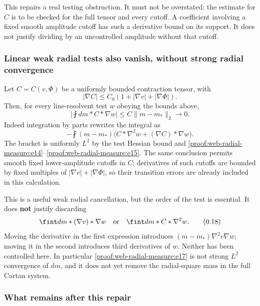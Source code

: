 This repairs a real testing obstruction. It must not be overstated: the estimate for \(C\) is to be checked for the full tensor and every cutoff. A coefficient involving a fixed smooth amplitude cutoff has such a derivative bound on its support. It does not justify dividing by an uncontrolled amplitude without that cutoff.

\hypertarget{proof:web-radial-measure:Linear-weak-radial-tests-also-vanish--without-strong-radial-convergence}{%
\subsubsection{Linear weak radial tests also vanish, without strong radial convergence}\label{proof:web-radial-measure:Linear-weak-radial-tests-also-vanish--without-strong-radial-convergence}}

Let \(C=C(v,\Phi)\) be a uniformly bounded contraction tensor, with \[
 |\nabla C|\le C_0(1+|\nabla v|+|\nabla\Phi|).
\] Then, for every line-resolvent test \(w\) obeying the bounds above, \[
 \boxed{\left|\fint dm*C*\nabla w\right|
 \le C\|m-m_*\|_2\to0.}
 \tag{\thesection.17}\label{proof:web-radial-measure:e17}
\] Indeed integration by parts rewrites the integral as \[
 -\fint(m-m_*)\bigl(C*\nabla^2w+(\nabla C)*\nabla w\bigr).
\] The bracket is uniformly \(L^2\) by the test Hessian bound and \eqref{proof:web-radial-measure:e14}–\eqref{proof:web-radial-measure:e15}. The same conclusion permits smooth fixed lower-amplitude cutoffs in \(C\): derivatives of such cutoffs are bounded by fixed multiples of \(|\nabla v|+|\nabla\Phi|\), so their transition errors are already included in this calculation.

This is a useful weak radial cancellation, but the order of the test is essential. It does \textbf{not} justify discarding \[
 \fint dm*(\nabla v)*\nabla w
 \quad\hbox{or}\quad
 \fint dm*C*\nabla^2w.
 \tag{\thesection.18}\label{proof:web-radial-measure:e18}
\] Moving the derivative in the first expression introduces \((m-m_*)\nabla^2v\nabla w\); moving it in the second introduces third derivatives of \(w\). Neither has been controlled here. In particular \eqref{proof:web-radial-measure:e17} is not strong \(L^2\) convergence of \(dm\), and it does not yet remove the radial-square mass in the full Cartan system.

\hypertarget{proof:web-radial-measure:What-remains-after-this-repair}{%
\subsubsection{What remains after this repair}\label{proof:web-radial-measure:What-remains-after-this-repair}}

